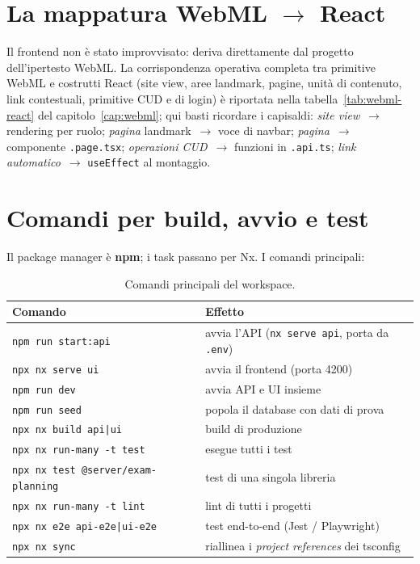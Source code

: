 \documentclass[11pt,a4paper,oneside]{report}
\newcommand{\code}[1]{\texttt{\small #1}}
\newcommand{\file}[1]{\texttt{\small #1}}
\begin{document}
\section{La mappatura WebML \texorpdfstring{$\rightarrow$}{->} React}
Il frontend non è stato improvvisato: deriva direttamente dal progetto
dell'ipertesto WebML. La corrispondenza operativa completa tra primitive WebML e
costrutti React (site view, aree landmark, pagine, unità di contenuto, link
contestuali, primitive CUD e di login) è riportata nella
tabella~\ref{tab:webml-react} del capitolo~\ref{cap:webml}; qui basti ricordare
i capisaldi: \emph{site view}~$\rightarrow$ rendering per ruolo; \emph{pagina}
landmark~$\rightarrow$ voce di navbar; \emph{pagina}~$\rightarrow$ componente
\file{*.page.tsx}; \emph{operazioni CUD}~$\rightarrow$ funzioni in
\file{*.api.ts}; \emph{link automatico}~$\rightarrow$ \code{useEffect} al
montaggio.

\section{Comandi per build, avvio e test}
Il package manager è \textbf{npm}; i task passano per Nx. I comandi principali:

\begin{table}[h]
\centering
\small
\renewcommand{\arraystretch}{1.2}
\begin{tabularx}{\linewidth}{@{}lX@{}}
\toprule
\textbf{Comando} & \textbf{Effetto} \\
\midrule
\code{npm run start:api}        & avvia l'API (\code{nx serve api}, porta da \file{.env}) \\
\code{npx nx serve ui}          & avvia il frontend (porta 4200) \\
\code{npm run dev}              & avvia API e UI insieme \\
\code{npm run seed}             & popola il database con dati di prova \\
\code{npx nx build api|ui}      & build di produzione \\
\code{npx nx run-many -t test}  & esegue tutti i test \\
\code{npx nx test @server/exam-planning} & test di una singola libreria \\
\code{npx nx run-many -t lint}  & lint di tutti i progetti \\
\code{npx nx e2e api-e2e|ui-e2e}& test end-to-end (Jest / Playwright) \\
\code{npx nx sync}              & riallinea i \emph{project references} dei tsconfig \\
\bottomrule
\end{tabularx}
\caption{Comandi principali del workspace.}
\end{table}
\end{document}

